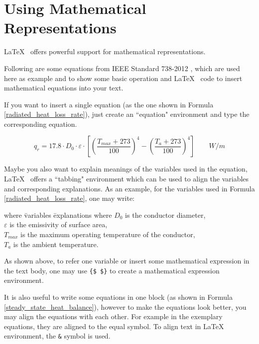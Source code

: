 \chapter{Using Mathematical Representations}

\LaTeX ~ offers powerful support for mathematical representations.

Following are some equations from IEEE Standard 738-2012 \cite{IEEEPower&EnergySociety.23December2013}, which are used here as example and to show some basic operation and \LaTeX ~ code to insert mathematical equations into your text. 

If you want to insert a single equation (as the one shown in Formula \ref{radiated_heat_loss_rate}), just create an ``equation" environment and type the corresponding equation.

\begin{equation}
	q_r = 17.8 {\cdot} D_0 {\cdot} {\varepsilon} {\cdot}\left[
	\left( \frac{T_{max}{+}273}{100} \right)^4 - \left( \frac{T_a{+}273}{100} \right)^4
	\right] \qquad W/m
	\label{radiated_heat_loss_rate}
\end{equation}

Maybe you also want to explain meanings of the variables used in the equation, \LaTeX ~ offers a ``tabbing" environment which can be used to align the variables and corresponding explanations. As an example, for the variables used in Formula \ref{radiated_heat_loss_rate}, one may write:

\begin{tabbing}
	where \hspace{0.3cm} \= variables  \= explanations \kill
	where \> {$D_0$} \> is the conductor diameter, \\
	\> {$\varepsilon$} \> is the emissivity of surface area, \\
	\> {$T_{max}$} \> is the maximum operating temperature of the conductor, \\
	\> {$T_a$} \> is the ambient temperature.
\end{tabbing}

As shown above, to refer one variable or insert some mathematical expression in the text body, one may use {\verb|{$ $}|} to create a mathematical expression environment.

It is also useful to write some equations in one block (as shown in Formula \ref{steady_state_heat_balance}), however to make the equations look better, you may align the equations with each other. For example in the exemplary equations, they are aligned to the equal symbol. To align text in \LaTeX ~ environment, the {\verb|&|} symbol is used.

